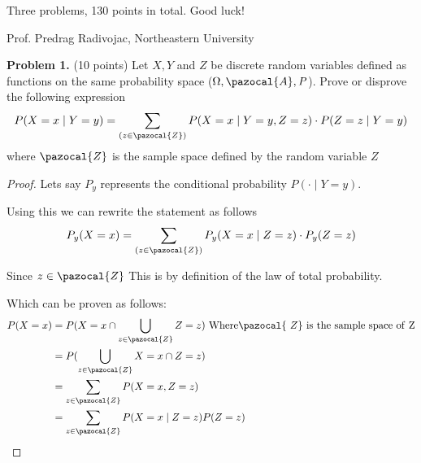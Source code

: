 \documentclass[a4 paper]{article}
\begin{document}
	\begin{center}
    Three problems, 130 points in total. Good luck!
    
		Prof. Predrag Radivojac, Northeastern University
	\end{center}
	
	\textbf{Problem 1.} (10 points) Let $\mathit{X}, \mathit{Y}$ and $\mathit{Z}$ be discrete random variables defined as functions on the same probability space ($\Omega, \pazocal{A}, \mathit{P}$). Prove or disprove the following expression
	\[ P(X=x \mid Y=y) = \sum_{(z \in \pazocal{Z})} P(X=x\mid Y=y, Z=z) \cdot P(Z=z \mid Y=y)\]
	where $\pazocal{Z}$ is the sample space defined by the random variable $Z$
	
	\begin{proof}
	Lets say $P_y$ represents the conditional probability $P(\cdot\mid Y=y)$.
	
	Using this we can rewrite the statement as follows
	\[ P_y(X=x) = \sum_{(z \in \pazocal{Z})} P_y(X=x\mid Z=z) \cdot P_y(Z=z)\]
	
	Since $z \in \pazocal{Z}$ This is by definition of the law of total probability.
	
	Which can be proven as follows:
		\begin{equation*}
			\begin{split}
				 P(X=x) & = P(X=x \cap \bigcup_{z \in \pazocal{Z}} Z=z) \mathrm{\ Where} \pazocal{\ Z} \mathrm{\ is\ the\ sample\ space\ of\ Z} \\ 
				 & = P(\bigcup_{z \in \pazocal{Z}} X=x \cap Z=z) \\
		 		 & = \sum_{z \in \pazocal{Z}} P(X=x, Z=z) \\
		   	 & = \sum_{z \in \pazocal{Z}} P(X=x \mid Z=z)P(Z=z)
			\end{split}		
		\end{equation*}
	\end{proof}
	
\end{document}
